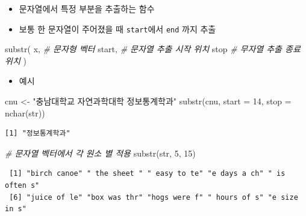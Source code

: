 \documentclass[
  11pt,
]{krantz}
\newenvironment{Shaded}{\begin{snugshade}}{\end{snugshade}}
\newcommand{\AttributeTok}[1]{\textcolor[rgb]{0.61,0.61,0.61}{#1}}
\newcommand{\CommentTok}[1]{\textcolor[rgb]{0.37,0.37,0.37}{\textit{#1}}}
\newcommand{\DecValTok}[1]{\textcolor[rgb]{0.06,0.06,0.06}{#1}}
\newcommand{\FunctionTok}[1]{\textcolor[rgb]{0,0,0}{#1}}
\newcommand{\NormalTok}[1]{#1}
\newcommand{\OtherTok}[1]{\textcolor[rgb]{0.37,0.37,0.37}{#1}}
\newcommand{\StringTok}[1]{\textcolor[rgb]{0.5,0.5,0.5}{#1}}
\providecommand{\tightlist}{%
  \setlength{\itemsep}{0pt}\setlength{\parskip}{0pt}}
\begin{document}
\begin{itemize}
\tightlist
\item
  문자열에서 특정 부분을 추출하는 함수
\item
  보통 한 문자열이 주어졌을 때 \texttt{start}에서 \texttt{end} 까지 추출
\end{itemize}

\footnotesize

\begin{Shaded}
\begin{Highlighting}[]
\FunctionTok{substr}\NormalTok{(}
\NormalTok{  x, }\CommentTok{\# 문자형 벡터}
\NormalTok{  start, }\CommentTok{\# 문자열 추출 시작 위치}
\NormalTok{  stop }\CommentTok{\# 무자열 추출 종료 위치}
\NormalTok{)}
\end{Highlighting}
\end{Shaded}

\normalsize

\begin{itemize}
\tightlist
\item
  예시
\end{itemize}

\footnotesize

\begin{Shaded}
\begin{Highlighting}[]
\NormalTok{cnu }\OtherTok{\textless{}{-}} \StringTok{"충남대학교 자연과학대학 정보통계학과"}
\FunctionTok{substr}\NormalTok{(cnu, }\AttributeTok{start =} \DecValTok{14}\NormalTok{, }\AttributeTok{stop =} \FunctionTok{nchar}\NormalTok{(str))}
\end{Highlighting}
\end{Shaded}

\begin{verbatim}
[1] "정보통계학과"
\end{verbatim}

\begin{Shaded}
\begin{Highlighting}[]
\CommentTok{\# 문자열 벡터에서 각 원소 별 적용}
\FunctionTok{substr}\NormalTok{(str, }\DecValTok{5}\NormalTok{, }\DecValTok{15}\NormalTok{)}
\end{Highlighting}
\end{Shaded}

\begin{verbatim}
 [1] "birch canoe" " the sheet " " easy to te" "e days a ch" " is often s"
 [6] "juice of le" "box was thr" "hogs were f" " hours of s" "e size in s"
\end{verbatim}
\end{document}
